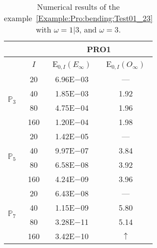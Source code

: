 \begin{table}[H]
\caption{Numerical results of the example~\ref{Example:Pro:bending:Test01_23} with $\omega=1|3$, and $\omega=3$.}
\setlength{\tabcolsep}{5pt}
\centering
\begin{tabular}{@{}l c c c@{}}
\toprule
 &  & \multicolumn{2}{c}{PRO1}\\
\midrule
 & $I$ & E$_{0,I}(E_{\infty})$ & E$_{0,I}(O_{\infty})$\\
\midrule
\multirow{4}{*}{$\mathbb{P}_{3}$} & 20 & 6.96E$-$03 & ---\\
 & 40 & 1.85E$-$03 & 1.92\\
 & 80 & 4.75E$-$04 & 1.96\\
 & 160 & 1.20E$-$04 & 1.98\\
\midrule
\multirow{4}{*}{$\mathbb{P}_{5}$} & 20 & 1.42E$-$05 & ---\\
 & 40 & 9.97E$-$07 & 3.84\\
 & 80 & 6.58E$-$08 & 3.92\\
 & 160 & 4.24E$-$09 & 3.96\\
\midrule
\multirow{4}{*}{$\mathbb{P}_{7}$} & 20 & 6.43E$-$08 & ---\\
 & 40 & 1.15E$-$09 & 5.80\\
 & 80 & 3.28E$-$11 & 5.14\\
 & 160 & 3.42E$-$10 & $\uparrow$\\
\bottomrule
\end{tabular}
\label{Table:PRO:test_01_23_test7}
\end{table}
